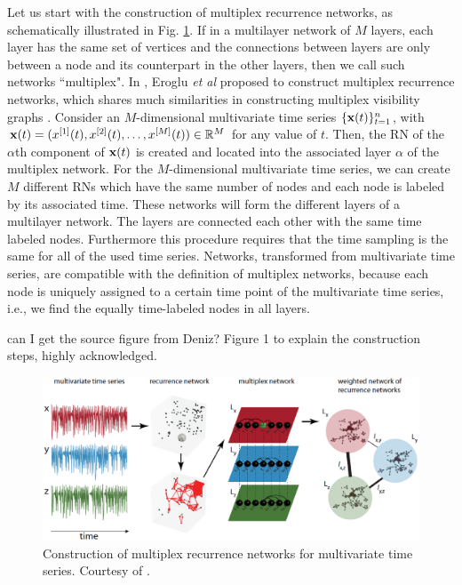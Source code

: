 		Let us start with the construction of multiplex recurrence networks, as schematically illustrated in Fig. \ref{fig:multiRN}. If in a multilayer network of $M$ layers, each layer has the same set of vertices and the connections between layers are only between a node and its counterpart in the other layers, then we call such networks ``multiplex". In \cite{Eroglu2018}, Eroglu {\textit{et al}} proposed to construct multiplex recurrence networks, which shares much similarities in constructing multiplex visibility graphs \cite{Lacasa2015b}. Consider an $M$-dimensional multivariate time series $\{{\bf{x}}(t) \}_{t=1}^{n}$, with ${\bf{x}}(t) = (x^{[1]}(t), x^{[2]}(t), \dots, x^{[M]}(t)) \in \mathbb{R}^M$ for any value of $t$. Then, the RN of the $\alpha$th component of ${\bf{x}}(t)$ is created and located into the associated layer $\alpha$ of the multiplex network. For the $M$-dimensional multivariate time series, we can create $M$ different RNs which have the same number of nodes and each node is labeled by its associated time. These networks will form the different layers of a multilayer network. The layers are connected each other with the same time labeled nodes. Furthermore this procedure requires that the time sampling is the same for all of the used time series.  Networks, transformed from multivariate time series, are compatible with the definition of multiplex networks, because each node is uniquely assigned to a certain time point of the multivariate time series, i.e., we find the equally time-labeled nodes in all layers. 
		
		{\color{red} can I get the source figure from Deniz? Figure 1 to explain the construction steps, highly acknowledged.} 
		\begin{figure}
			\centering
			\includegraphics[width=\columnwidth]{Chapter03_RecurrenceNt/multiPrn.eps}
		\caption{\small{Construction of multiplex recurrence networks for multivariate time series. Courtesy of \cite{Eroglu2018}. } \label{fig:multiRN}}
		\end{figure}
		
